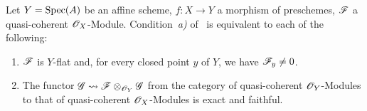 \begin{proposition}[2.2.2]
\label{IV.2.2.2}
Let $Y=\operatorname{Spec}(A)$ be an affine scheme, $f:X\to Y$ a morphism of preschemes, $\mathscr{F}$ a quasi-coherent $\mathscr{O}_X$-Module.
Condition~\emph{a)} of~ is equivalent to each of the following:
\begin{enumerate}
  \item[\emph{b$'$)}] $\mathscr{F}$ is $Y$-flat and, for every \textup{closed} point $y$ of $Y$, we have $\mathscr{F}_y\neq 0$.
  \item[\emph{c)}] The functor $\mathscr{G}\leadsto\mathscr{F}\otimes_{\mathscr{O}_Y}\mathscr{G}$ from the category of quasi-coherent $\mathscr{O}_Y$-Modules to that of quasi-coherent $\mathscr{O}_X$-Modules is exact and faithful.
\end{enumerate}
\end{proposition}

